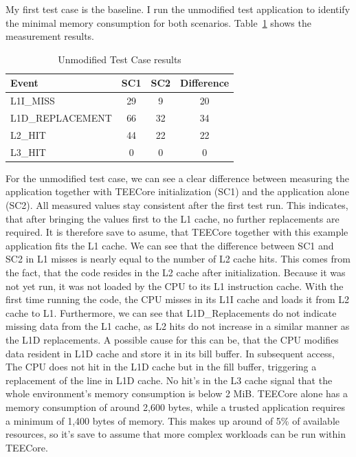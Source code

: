My first test case is the baseline. I run the unmodified test application to
identify the minimal memory consumption for both scenarios.
Table~\ref{50:tab:ping_base} shows the measurement results. 

\begin{table}[ht]
    \centering
    \begin{tabular}{ |l||c|c|c| }
        \hline
        Event            & SC1 & SC2 & Difference \\
        \hline
        L1I\_MISS        & 29  & 9   & 20         \\
        L1D\_REPLACEMENT & 66  & 32  & 34         \\
        L2\_HIT          & 44  & 22  & 22         \\
        L3\_HIT          & 0   & 0   & 0          \\
        \hline
    \end{tabular}
    \caption{Unmodified Test Case results}
    \label{50:tab:ping_base}
\end{table}

For the unmodified test case, we can see a clear difference between measuring
the application together with TEECore initialization (SC1) and the application
alone (SC2). All measured values stay consistent after the first test run. This
indicates, that after bringing the values first to the L1 cache, no further
replacements are required. It is therefore save to asume, that TEECore together
with this example application fits the L1 cache. We can see that the difference
between SC1 and SC2 in L1 misses is nearly equal to the number of L2 cache hits.
This comes from the fact, that the code resides in the L2 cache after
initialization. Because it was not yet run, it was not loaded by the CPU to its
L1 instruction cache. With the first time running the code, the CPU misses in
its L1I cache and loads it from L2 cache to L1. Furthermore, we can see that
L1D\_Replacements do not indicate missing data from the L1 cache, as L2 hits do
not increase in a similar manner as the L1D replacements. A possible cause for
this can be, that the CPU modifies data resident in L1D cache and store it in
its bill buffer. In subsequent access, The CPU does not hit in the L1D cache but
in the fill buffer, triggering a replacement of the line in L1D cache. No hit's
in the L3 cache signal that the whole environment's memory consumption is below
2 MiB. TEECore alone has a memory consumption of around 2,600 bytes, while a
trusted application requires a minimum of 1,400 bytes of memory. This makes up
around of 5\% of available resources, so it's save to assume that more complex
workloads can be run within TEECore.\\


